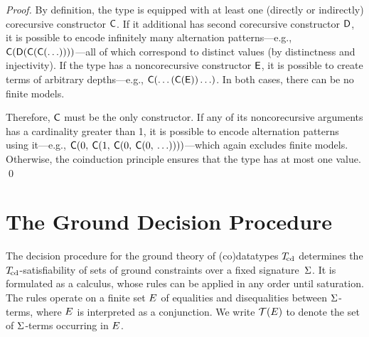 \begin{report}
\begin{proof}
By definition, the type is equipped with at least one (directly or indirectly)
corecursive constructor $\textsf{C}$. If it additional has second
corecursive constructor $\textsf{D}$, it is possible to encode infinitely many
alternation patterns---e.g.,
$\textsf{C}(\textsf{D}(\textsf{C}(\textsf{C}(\ldots))))$---all of which correspond
to distinct values (by distinctness and injectivity). If the type has a
noncorecursive constructor $\textsf{E}$, it is possible to create terms of
arbitrary depths---e.g., $\textsf{C}(\ldots(\textsf{C}(\textsf{E}))\ldots)$. In
both cases, there can be no finite models.

Therefore, $\textsf{C}$ must be the only constructor.
If any of its noncorecursive arguments has a cardinality greater than 1,
it is possible to encode alternation patterns using it---e.g.,
$\textsf{C}(0,\: \textsf{C}(1,\: \textsf{C}(0,\: \textsf{C}(0,\: \ldots))))$---which
again excludes finite models. Otherwise, the coinduction principle ensures
that the type has at most one value.
\qed
\end{proof}
\end{report}


\section{The Ground Decision Procedure} %
\label{sec:a-ground-decision-procedure-for-co-datatypes}

The decision procedure for the ground theory of (co)datatypes $T_{\!\mathrm{cd}}$ determines the
$T_{\!\mathrm{cd}}$-satisfiability of sets of ground constraints over a fixed
signature~$\mathrm{\Sigma}$. It is formulated as a calculus, whose rules can be applied in
any order until saturation.
%
The rules operate on a finite set $E$ of equalities and disequalities
between $\mathrm{\Sigma}$-terms, where $E$ is interpreted as a conjunction.
We write $\mathcal{T}(E)$ to denote the set of $\mathrm{\Sigma}$-terms occurring in $E$.

